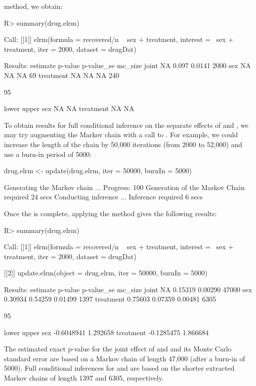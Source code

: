 \documentclass[article, shortnames]{jss}
\begin{document}
 method, we obtain:
\begin{CodeChunk}
\begin{CodeInput}
R> summary(drug.elrm)
\end{CodeInput}
\begin{CodeOutput}
Call:
[[1]]
elrm(formula = recovered/n ~ sex + treatment,
     interest = ~sex + treatment, iter = 2000,
     dataset = drugDat)

Results:
          estimate p-value p-value_se mc_size
joint           NA   0.097     0.0141    2000
sex             NA      NA         NA      69
treatment       NA      NA         NA     240

95%

          lower upper
sex          NA    NA
treatment    NA    NA
\end{CodeOutput}
\end{CodeChunk}
To obtain results for full conditional inference on the separate
effects of  and , we may try augmenting
the Markov chain with a call to . For example, we
could increase the length of the chain by 50,000 iterations (from
2000 to 52,000) and use a burn-in period of 5000:
\begin{CodeChunk}
\begin{CodeInput}
drug.elrm <- update(drug.elrm, iter = 50000, burnIn = 5000)
\end{CodeInput}
\begin{CodeOutput}
Generating the Markov chain ...
Progress: 100%
Generation of the Markov Chain required 24 secs
Conducting inference ...
Inference required 6 secs
\end{CodeOutput}
\end{CodeChunk}
Once the  is complete, applying the  method
gives the following results:
\begin{CodeChunk}
\begin{CodeInput}
R> summary(drug.elrm)
\end{CodeInput}
\begin{CodeOutput}
Call: [[1]] elrm(formula = recovered/n ~ sex + treatment,
                 interest = ~sex + treatment, iter = 2000,
                 dataset = drugDat)

[[2]] update.elrm(object = drug.elrm, iter = 50000, burnIn = 5000)

Results:
          estimate p-value p-value_se mc_size
joint           NA 0.15319    0.00290   47000
sex        0.30934 0.54259    0.01499    1397
treatment  0.75603 0.07359    0.00481    6305

95%

               lower    upper
sex       -0.6048941 1.292658
treatment -0.1285475 1.866684
\end{CodeOutput}
\end{CodeChunk}
The estimated exact p-value for the joint effect of  and
 and its Monte Carlo standard error are based on a
Markov chain of length 47,000 (after a burn-in of 5000). Full
conditional inferences for  and  are
based on the shorter extracted Markov chains of length 1397 and
6305, respectively.
\end{document}
